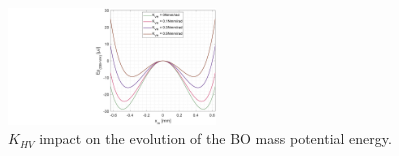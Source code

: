 \documentclass[3p,twocolumn,preprint]{elsarticle}
\begin{document}
\newpage
\lipsum[1]
\begin{figure}[!htbp]
	\centering
	\captionsetup{justification=centering}
	\includegraphics[trim={14cm 0cm 0cm 0cm},clip, width=0.49\textwidth]{figures/(Ep)_vs_(x_m)_avec_plusieurs_K_VH.pdf}
	\caption{$K_{HV}$ impact on the evolution of the BO mass potential energy.}
	\label{fig:(Ep)_vs_(x_m)_avec_plusieurs_K_VH}
\end{figure}
\end{document}
